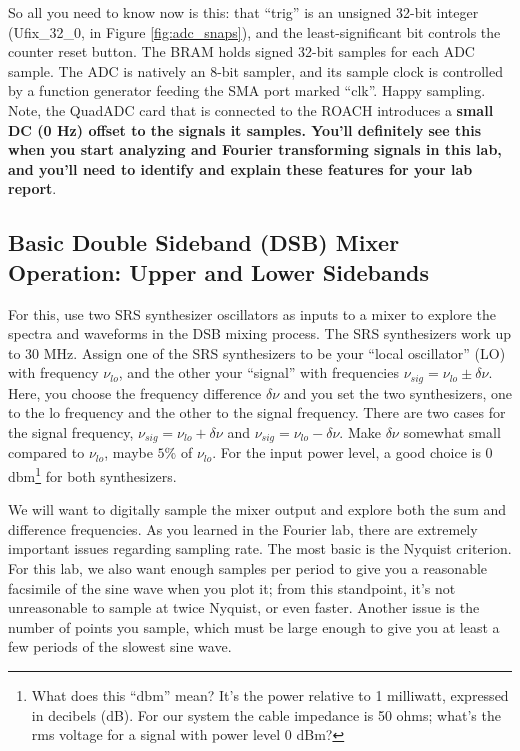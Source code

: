 \documentclass[11pt]{article}
\begin{document}
So all you need to know now is this: that ``trig'' is an unsigned 32-bit integer (Ufix\_32\_0, in
Figure \ref{fig:adc_snaps}), and the least-significant bit
controls the counter reset button.  The BRAM holds signed 32-bit samples for each ADC sample.  The
ADC is natively an 8-bit sampler, and its sample clock is controlled by a function generator feeding the
SMA port marked ``clk''.  Happy sampling.  Note, the QuadADC card that is connected to the ROACH introduces
a {\bf small DC (0 Hz) offset to the signals it samples.  You'll definitely see this when you start
analyzing and Fourier transforming signals in this lab, and you'll need to identify and explain these features
for your lab report}.


\subsection{Basic Double Sideband (DSB) Mixer Operation: Upper and Lower Sidebands}
\label{upperlowerdsb}

        For this, use two SRS synthesizer oscillators as inputs to a
mixer to explore the spectra and waveforms in the DSB mixing process.
The SRS synthesizers work up to 30 MHz.  Assign one of the SRS
synthesizers to be your ``local oscillator'' (LO) with frequency
$\nu_{lo}$, and the other your ``signal'' with frequencies $\nu_{sig} =
\nu_{lo} \pm \delta \nu$.  Here, you choose the frequency difference
$\delta \nu$ and you set the two synthesizers, one to the lo
frequency and the other to the signal frequency. There are two cases for
the signal frequency, $\nu_{sig} = \nu_{lo} + \delta \nu$ and
$\nu_{sig} = \nu_{lo} - \delta \nu$.  Make $\delta \nu$ somewhat small
compared to $\nu_{lo}$, maybe $5\%$ of $\nu_{lo}$.  For the input power
level, a good choice is 0 dbm\footnote{What does this ``dbm'' mean? It's
the power relative to 1 milliwatt, expressed in decibels (dB). For our
system the cable impedance is 50 ohms; what's the rms voltage for a
signal with power level 0 dBm?} for both synthesizers.

        We will want to digitally sample the mixer output and explore
both the sum and difference frequencies. As you learned in the Fourier
lab, there are extremely important issues regarding sampling rate. The
most basic is the Nyquist criterion. For this lab, we also want enough
samples per period to give you a reasonable facsimile of the sine wave
when you plot it; from this standpoint, it's not unreasonable to sample
at twice Nyquist, or even faster.  Another issue is the number of
points you sample, which must be large enough to give you at least a
few periods of the slowest sine wave.
\end{document}
